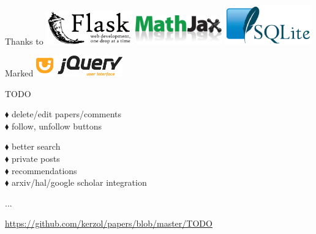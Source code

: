 \documentclass[xcolor=dvipsnames]{beamer}
\begin{document}
\begin{frame}{Thanks to}
  \vfill
  \centering
  \includegraphics[width=0.28\textwidth]{fig/flask.pdf}
  \hspace{1.7em}
  \includegraphics[width=0.28\textwidth]{fig/mj_logo.png}
  \hspace{1.7em}
  \includegraphics[width=0.28\textwidth]{fig/sqlite370_banner.png}

  \vspace{1em}
  
  \Large Marked
  \hspace{1.7em}
  \hspace{1.7em}
  \includegraphics[width=0.28\textwidth]{fig/559px-JQuery_UI_Logo.png}

\end{frame}





\begin{frame}{TODO}

  $\blacklozenge$ delete/edit papers/comments \\
  $\blacklozenge$ follow, unfollow buttons \\

  \vspace{1em}

  $\blacklozenge$ better search \\
  $\blacklozenge$ private posts \\
  $\blacklozenge$ recommendations \\
  $\blacklozenge$ arxiv/hal/google scholar integration \\

  \vspace{1em}

  ...
  
  \url{https://github.com/kerzol/papers/blob/master/TODO}
  

  
\end{frame}
\end{document}
